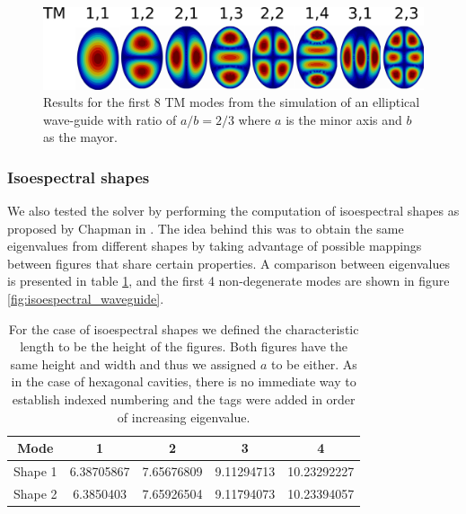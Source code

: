 \begin{figure}
\centering
\includegraphics[scale=0.12]{./img/elliptical_waveguide.pdf}
\caption{Results for the first 8 TM modes from the simulation of an elliptical wave-guide with ratio of $a/b=2/3$ where $a$ is the minor axis and $b$ as the mayor.}
\label{fig:elliptical_waveguide}
\end{figure}

\subsubsection{Isoespectral shapes}
We also tested the solver by performing the computation of isoespectral shapes as proposed by Chapman in \cite{Chapman1995}. The idea behind this was to obtain the same eigenvalues from different shapes by taking advantage of possible mappings between figures that share certain properties.
A comparison between eigenvalues is presented in table \ref{tab:iso_wav_comparison}, and the first 4 non-degenerate modes are shown in figure \ref{fig:isoespectral_waveguide}.
\begin{table}
\begin{center}
\begin{tabular}{|c|c|c|c|c|}
\hline 
Mode & 1 & 2 & 3 & 4 \\ 
\hline 
Shape 1  & 6.38705867 & 7.65676809 & 9.11294713 & 10.23292227 \\ 
\hline 
Shape 2 & 6.3850403 & 7.65926504 & 9.11794073 & 10.23394057 \\ 
\hline 
\end{tabular}
\caption{For the case of isoespectral shapes we defined the characteristic length to be the height of the figures. Both figures have the same height and width and thus we assigned $a$ to be either. As in the case of hexagonal cavities, there is no immediate way to establish indexed numbering and the tags were added in order of increasing eigenvalue.}
\label{tab:iso_wav_comparison}
\end{center}
\end{table}

